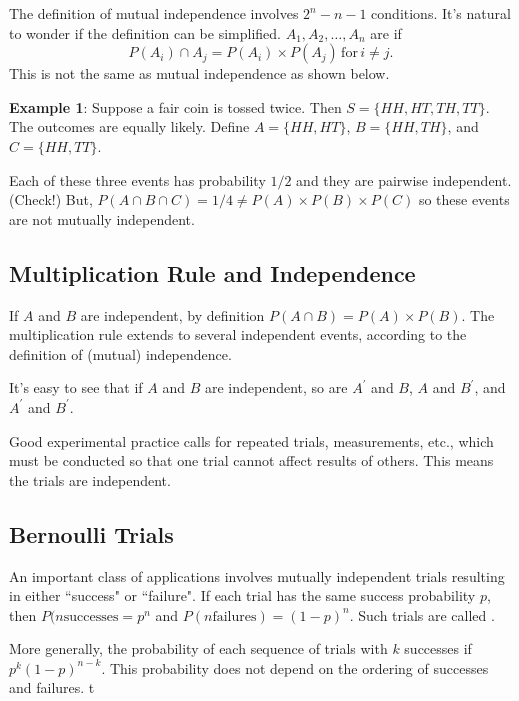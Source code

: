 The definition of mutual independence involves $2^{n}-n-1$ conditions. It's natural to wonder if the definition can be simplified. $A_{1}, A_{2}, \ldots, A_{n}$ are  if $$P(A_{i}) \cap A_{j} = P(A_{i}) \times P(A_{j}) \, \text{for} \, i  \neq j.$$ This is not the same as mutual independence as shown below.

\textbf{Example 1}: Suppose a fair coin is tossed twice. Then $S=\{HH, HT, TH, TT\}$. The outcomes are equally likely. Define $A = \{HH, HT\}$, $B = \{HH, TH\}$, and $C = \{HH, TT\}$.

Each of these three events has probability $1/2$ and they are pairwise independent. (Check!) But, $P(A \cap B \cap C) = 1/4 \neq P(A) \times P(B) \times P(C)$ so these events are not mutually independent.

\subsection{Multiplication Rule and Independence}
If $A$ and $B$ are independent, by definition $P(A \cap B) = P(A) \times P(B)$. The multiplication rule extends to several independent events, according to the definition of (mutual) independence.

It's easy to see that if $A$ and $B$ are independent, so are $A^\mathsf{'}$ and $B$, $A$ and $B^\mathsf{'}$, and $A^\mathsf{'}$ and $B^\mathsf{'}$.

Good experimental practice calls for repeated trials, measurements, etc., which must be conducted so that one trial cannot affect results of others. This means the trials are independent.

\subsection{Bernoulli Trials}

An important class of applications involves mutually independent trials resulting in either ``success" or ``failure". If each trial has the same success probability $p$, then $P(n \text{successes} = p^n$ and $P(n \text{failures}) = (1-p)^n$. Such trials are called .

More generally, the probability of each sequence of trials with $k$ successes if $p^k(1-p)^{n-k}$. This probability does not depend on the ordering of successes and failures.
t

